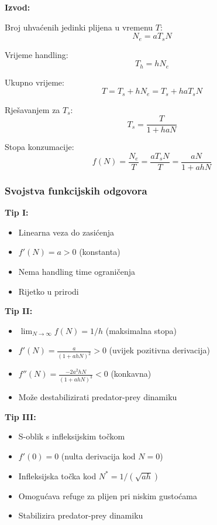 \documentclass[11pt,oneside]{book}
\begin{document}
\textbf{Izvod:}

Broj uhvaćenih jedinki plijena u vremenu $T$:
\begin{equation}
	N_e = aT_s N
\end{equation}

Vrijeme handling:
\begin{equation}
	T_h = hN_e
\end{equation}

Ukupno vrijeme:
\begin{equation}
	T = T_s + hN_e = T_s + haT_s N
\end{equation}

Rješavanjem za $T_s$:
\begin{equation}
	T_s = \frac{T}{1 + haN}
\end{equation}

Stopa konzumacije:
\begin{equation}
	f(N) = \frac{N_e}{T} = \frac{aT_s N}{T} = \frac{aN}{1 + ahN}
\end{equation}

\subsubsection{Svojstva funkcijskih odgovora}

\textbf{Tip I:}
\begin{itemize}
	\item Linearna veza do zasićenja
	\item $f'(N) = a > 0$ (konstanta)
	\item Nema handling time ograničenja
	\item Rijetko u prirodi
\end{itemize}

\textbf{Tip II:}
\begin{itemize}
	\item $\lim_{N \to \infty} f(N) = 1/h$ (maksimalna stopa)
	\item $f'(N) = \frac{a}{(1 + ahN)^2} > 0$ (uvijek pozitivna derivacija)
	\item $f''(N) = \frac{-2a^2hN}{(1 + ahN)^3} < 0$ (konkavna)
	\item Može destabilizirati predator-prey dinamiku
\end{itemize}

\textbf{Tip III:}
\begin{itemize}
	\item S-oblik s infleksijskim točkom
	\item $f'(0) = 0$ (nulta derivacija kod $N = 0$)
	\item Infleksijska točka kod $N^* = 1/(\sqrt{ah})$
	\item Omogućava refuge za plijen pri niskim gustoćama
	\item Stabilizira predator-prey dinamiku
\end{itemize}
\end{document}
